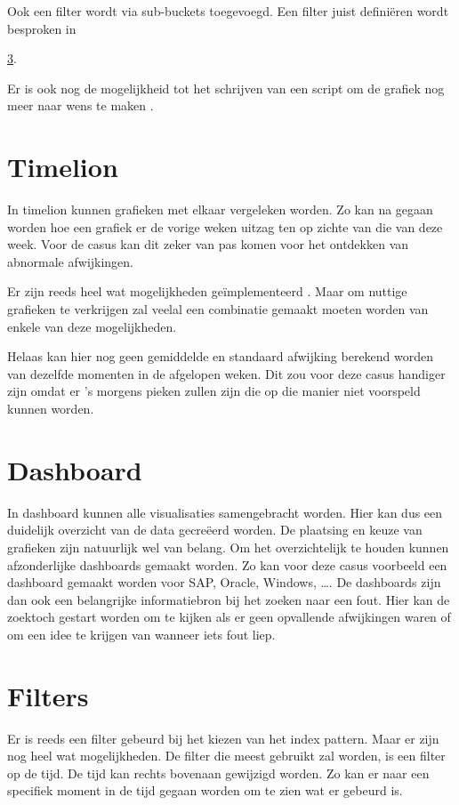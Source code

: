 Ook een filter wordt via sub-buckets toegevoegd. Een filter juist definiëren wordt besproken in {\ref{sec:filters}.

Er is ook nog de mogelijkheid tot het schrijven van een script om de grafiek nog meer naar wens te maken \autocite{painless}. 

\section{Timelion}
\label{sec:timelion}

In timelion kunnen grafieken met elkaar vergeleken worden. Zo kan na gegaan worden hoe een grafiek er de vorige weken uitzag ten op zichte van die van deze week.
Voor de casus kan dit zeker van pas komen voor het ontdekken van abnormale afwijkingen. 

Er zijn reeds heel wat mogelijkheden geïmplementeerd \autocite{timeliongithub}. 
Maar om nuttige grafieken te verkrijgen zal veelal een combinatie gemaakt moeten worden van enkele van deze mogelijkheden.

Helaas kan hier nog geen gemiddelde en standaard afwijking berekend worden van dezelfde momenten in de afgelopen weken.
Dit zou voor deze casus handiger zijn omdat er 's morgens pieken zullen zijn die op die manier niet voorspeld kunnen worden.

\section{Dashboard}
\label{sec:dashboard}

In dashboard kunnen alle visualisaties samengebracht worden. Hier kan dus een duidelijk overzicht van de data gecreëerd worden. De plaatsing en keuze van grafieken zijn natuurlijk wel van belang.
Om het overzichtelijk te houden kunnen afzonderlijke dashboards gemaakt worden. Zo kan voor deze casus voorbeeld een dashboard gemaakt worden voor SAP, Oracle, Windows, \dots.
De dashboards zijn dan ook een belangrijke informatiebron bij het zoeken naar een fout. Hier kan de zoektoch gestart worden om te kijken als er geen opvallende afwijkingen waren of om een idee te krijgen van wanneer iets fout liep.

\section{Filters}
\label{sec:filters}

Er is reeds een filter gebeurd bij het kiezen van het index pattern. Maar er zijn nog heel wat mogelijkheden.
De filter die meest gebruikt zal worden, is een filter op de tijd. De tijd kan rechts bovenaan gewijzigd worden. Zo kan er naar een specifiek moment in de tijd gegaan worden om te zien wat er gebeurd is.

}

